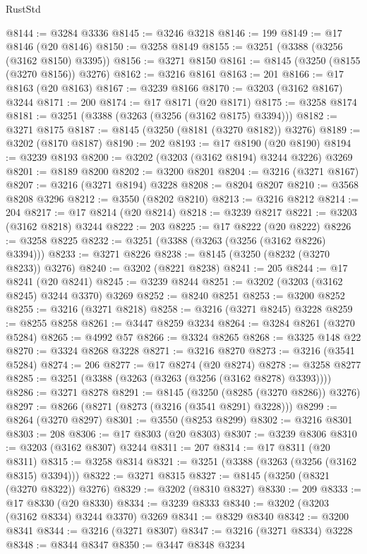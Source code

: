 \begin{lexlean}{RustStd}
\begin{coremodule}
@8144 := @3284 @3336
@8145 := @3246 @3218
@8146 := 199
@8149 := @17 @8146 (@20 @8146)
@8150 := @3258 @8149
@8155 := @3251 (@3388 (@3256 (@3162 @8150) @3395))
@8156 := @3271 @8150
@8161 := @8145 (@3250 (@8155 (@3270 @8156)) @3276)
@8162 := @3216 @8161
@8163 := 201
@8166 := @17 @8163 (@20 @8163)
@8167 := @3239 @8166
@8170 := @3203 (@3162 @8167) @3244
@8171 := 200
@8174 := @17 @8171 (@20 @8171)
@8175 := @3258 @8174
@8181 := @3251 (@3388 (@3263 (@3256 (@3162 @8175) @3394)))
@8182 := @3271 @8175
@8187 := @8145 (@3250 (@8181 (@3270 @8182)) @3276)
@8189 := @3202 (@8170 @8187)
@8190 := 202
@8193 := @17 @8190 (@20 @8190)
@8194 := @3239 @8193
@8200 := @3202 (@3203 (@3162 @8194) @3244 @3226) @3269
@8201 := @8189 @8200
@8202 := @3200 @8201
@8204 := @3216 (@3271 @8167)
@8207 := @3216 (@3271 @8194) @3228
@8208 := @8204 @8207
@8210 := @3568 @8208 @3296
@8212 := @3550 (@8202 @8210)
@8213 := @3216 @8212
@8214 := 204
@8217 := @17 @8214 (@20 @8214)
@8218 := @3239 @8217
@8221 := @3203 (@3162 @8218) @3244
@8222 := 203
@8225 := @17 @8222 (@20 @8222)
@8226 := @3258 @8225
@8232 := @3251 (@3388 (@3263 (@3256 (@3162 @8226) @3394)))
@8233 := @3271 @8226
@8238 := @8145 (@3250 (@8232 (@3270 @8233)) @3276)
@8240 := @3202 (@8221 @8238)
@8241 := 205
@8244 := @17 @8241 (@20 @8241)
@8245 := @3239 @8244
@8251 := @3202 (@3203 (@3162 @8245) @3244 @3370) @3269
@8252 := @8240 @8251
@8253 := @3200 @8252
@8255 := @3216 (@3271 @8218)
@8258 := @3216 (@3271 @8245) @3228
@8259 := @8255 @8258
@8261 := @3447 @8259 @3234
@8264 := @3284 @8261 (@3270 @5284)
@8265 := @4992 @57
@8266 := @3324 @8265
@8268 := @3325 @148 @22
@8270 := @3324 @8268 @3228
@8271 := @3216 @8270
@8273 := @3216 (@3541 @5284)
@8274 := 206
@8277 := @17 @8274 (@20 @8274)
@8278 := @3258 @8277
@8285 := @3251 (@3388 (@3263 (@3263 (@3256 (@3162 @8278) @3393))))
@8286 := @3271 @8278
@8291 := @8145 (@3250 (@8285 (@3270 @8286)) @3276)
@8297 := @8266 (@8271 (@8273 (@3216 (@3541 @8291) @3228)))
@8299 := @8264 (@3270 @8297)
@8301 := @3550 (@8253 @8299)
@8302 := @3216 @8301
@8303 := 208
@8306 := @17 @8303 (@20 @8303)
@8307 := @3239 @8306
@8310 := @3203 (@3162 @8307) @3244
@8311 := 207
@8314 := @17 @8311 (@20 @8311)
@8315 := @3258 @8314
@8321 := @3251 (@3388 (@3263 (@3256 (@3162 @8315) @3394)))
@8322 := @3271 @8315
@8327 := @8145 (@3250 (@8321 (@3270 @8322)) @3276)
@8329 := @3202 (@8310 @8327)
@8330 := 209
@8333 := @17 @8330 (@20 @8330)
@8334 := @3239 @8333
@8340 := @3202 (@3203 (@3162 @8334) @3244 @3370) @3269
@8341 := @8329 @8340
@8342 := @3200 @8341
@8344 := @3216 (@3271 @8307)
@8347 := @3216 (@3271 @8334) @3228
@8348 := @8344 @8347
@8350 := @3447 @8348 @3234

\end{coremodule}
\end{lexlean}
